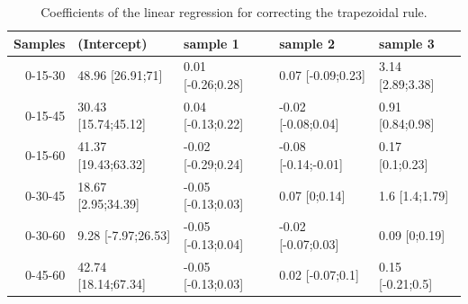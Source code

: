 \documentclass[12pt]{article}
\begin{document}
\begin{table}[ht]
\centering
\begin{tabular}{rllll}
  \hline
Samples & (Intercept) & sample 1 & sample 2 & sample 3 \\ 
  \hline
0-15-30 & 48.96 [26.91;71] & 0.01 [-0.26;0.28] & 0.07 [-0.09;0.23] & 3.14 [2.89;3.38] \\ 
  0-15-45 & 30.43 [15.74;45.12] & 0.04 [-0.13;0.22] & -0.02 [-0.08;0.04] & 0.91 [0.84;0.98] \\ 
  0-15-60 & 41.37 [19.43;63.32] & -0.02 [-0.29;0.24] & -0.08 [-0.14;-0.01] & 0.17 [0.1;0.23] \\ 
  0-30-45 & 18.67 [2.95;34.39] & -0.05 [-0.13;0.03] & 0.07 [0;0.14] & 1.6 [1.4;1.79] \\ 
  0-30-60 & 9.28 [-7.97;26.53] & -0.05 [-0.13;0.04] & -0.02 [-0.07;0.03] & 0.09 [0;0.19] \\ 
  0-45-60 & 42.74 [18.14;67.34] & -0.05 [-0.13;0.03] & 0.02 [-0.07;0.1] & 0.15 [-0.21;0.5] \\ 
   \hline
\end{tabular}
\caption{Coefficients of the linear regression for correcting the trapezoidal rule.}
\label{tab:coeflm}
\end{table}

\clearpage
\end{document}
